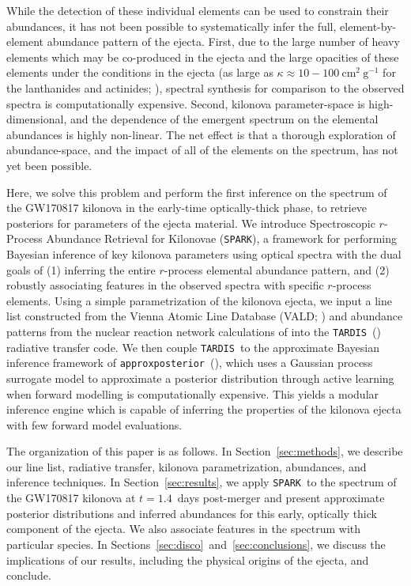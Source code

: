 \documentclass[twocolumn, twocolappendix]{aastex63}
\def\SPARK{\texttt{SPARK}}
\def\TARDIS{\texttt{TARDIS}}
\def\approxposterior{\texttt{approxposterior}}
\begin{document}
While the detection of these individual elements can be used to constrain their abundances, it has not been possible to systematically infer the full, element-by-element abundance pattern of the ejecta. First, due to the large number of heavy elements which may be co-produced in the ejecta and the large opacities of these elements under the conditions in the ejecta (as large as $\kappa \approx 10 - 100 ~\mathrm{cm^2~g^{-1}}$ for the lanthanides and actinides; \citealt{kasen13, kasen17, even20, tanaka20, silva22}), spectral synthesis for comparison to the observed spectra is computationally expensive. Second, kilonova parameter-space is high-dimensional, and the dependence of the emergent spectrum on the elemental abundances is highly non-linear. The net effect is that a thorough exploration of abundance-space, and the impact of all of the elements on the spectrum, has not yet been possible.

Here, we solve this problem and perform the first inference on the spectrum of the GW170817 kilonova in the early-time optically-thick phase, to retrieve posteriors for parameters of the ejecta material. We introduce Spectroscopic $r$-Process Abundance Retrieval for Kilonovae (\SPARK), a framework for performing Bayesian inference of key kilonova parameters using optical spectra with the dual goals of (1) inferring the entire $r$-process elemental abundance pattern, and (2) robustly associating features in the observed spectra with specific $r$-process elements. Using a simple parametrization of the kilonova ejecta, we input a line list constructed from the Vienna Atomic Line Database (VALD; \citealt{ryabchikova15, pakhomov19}) and abundance patterns from the nuclear reaction network calculations of \cite{wanajo18} into the \TARDIS~(\citealt{kerzendorf14}) radiative transfer code. We then couple \TARDIS~to the approximate Bayesian inference framework of \approxposterior~(\citealt{fleming18, fleming20}), which uses a Gaussian process surrogate model to approximate a posterior distribution through active learning when forward modelling is computationally expensive. This yields a modular inference engine which is capable of inferring the properties of the kilonova ejecta with few forward model evaluations.

The organization of this paper is as follows. In Section~\ref{sec:methods}, we describe our line list, radiative transfer, kilonova parametrization, abundances, and inference techniques. In Section~\ref{sec:results}, we apply \SPARK~to the spectrum of the GW170817 kilonova at $t = 1.4$~days post-merger and present approximate posterior distributions and inferred abundances for this early, optically thick component of the ejecta. We also associate features in the spectrum with particular species. In Sections~\ref{sec:disco}~and~\ref{sec:conclusions}, we discuss the implications of our results, including the physical origins of the ejecta, and conclude.
\end{document}
